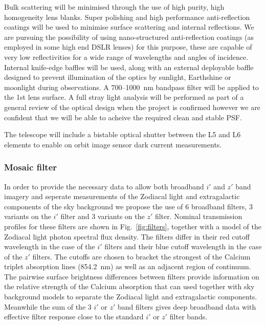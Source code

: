\documentclass[]{iac}
\begin{document}
Bulk scattering will be minimised through the use of high purity, high homogeneity lens blanks. Super polishing and high
performance anti-reflection coatings will be used to minimise surface scattering and internal reflections. We are
pursuing the possibility of using nano-structured anti-reflection coatings (as employed in some high end DSLR lenses)
for this purpose, these are capable of very low reflectivities for a wide range of wavelengths and angles of incidence.
Internal knife-edge baffles will be used, along with an external deployable baffle designed to prevent illumination of
the optics by sunlight, Earthshine or moonlight during observations. A 700--\SI{1000}{\nano\metre} bandpass filter will
be applied to the 1st lens surface. A full stray light analysis will be performed as part of a general review of the
optical design when the project is confirmed however we are confident that we will be able to acheive the required clean
and stable PSF.

The telescope will include a bistable optical shutter between the L5 and L6 elements to enable on orbit image sensor
dark current measurements.

\subsubsection{Mosaic filter} \label{sec:mosaic}

In order to provide the necessary data to allow both broadband $i'$ and $z'$ band imagery and seperate measurements of
the Zodiacal light and extragalactic components of the sky background we propose the use of 6 broadband filters, 3
variants on the $i'$ filter and 3 variants on the $z'$ filter. Nominal transmission profiles for these filters are shown
in Fig.~\ref{fig:filters}, together with a model of the Zodiacal light photon spectral flux density. The filters differ
in their red cutoff wavelength in the case of the $i'$ filters and their blue cutoff wavelength in the case of the $z'$
filters. The cutoffs are chosen to bracket the strongest of the Calcium triplet absorption lines
(\SI{854.2}{\nano\metre}) as well as an adjacent region of continuum. The pairwise surface brightness differences
between filters provide information on the relative strength of the Calcium absorption that can used together with sky
background models to separate the Zodiacal light and extragalactic components. Meanwhile the sum of the 3 $i'$ or $z'$
band filters gives deep broadband data with effective filter response close to the standard $i'$ or $z'$ filter bands.
\end{document}
